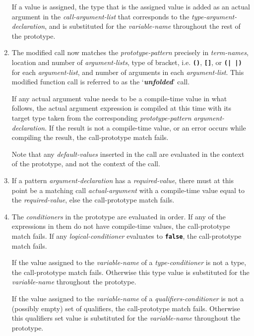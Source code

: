 \documentclass[12pt]{article}
\newcommand{\TT}[1]{{\tt \bfseries #1}}
\newcommand{\mkey}[2]{{\bf \em #1}\index{#1!#2}}
\begin{document}
\begin{enumerate}
If a value is assigned,
the type that is the assigned value is added as an actual argument
in the {\em call-argument-list} that corresponds
to the {\em type-argument-declaration}, and
is substituted for the {\em variable-name} throughout the rest of the
prototype.

\item
The modified call now matches the {\em prototype-pattern}
precisely in {\em term-names},
location and number of {\em argument-lists}, type of bracket, i.e. \TT{()},
\TT{[]}, or \TT{(|~|)} for each {\em argument-list}, and number of
arguments in each {\em argument-list}.
This modified function call is referred to as the
`\mkey{unfolded}{call}' call.

If any actual argument value needs to be a compile-time value in what
follows, the actual argument expression is compiled at this
time with its target type taken from the corresponding
{\em prototype-pattern} {\em argument-declaration}.
If the result is not a compile-time value, or an error occurs
while compiling the result, the call-prototype
match fails.

Note that any {\em default-values} inserted in the call
are evaluated in the context of the prototype, and not the
context of the call.

\item
If a pattern {\em argument-declaration} has a {\em required-value},
there must at this point be a matching call {\em actual-argument}
with a compile-time value equal to the {\em required-value},
else the call-prototype match fails.

\item
The {\em conditioners} in the prototype are evaluated
in order.  If any of the expressions in them do not have compile-time
values, the call-prototype match fails.
If any {\em logical-conditioner} evaluates
to \TT{false}, the call-prototype match fails.

If the value assigned to the {\em variable-name} of a
{\em type-conditioner} is not a type, the call-prototype match fails.
Otherwise this type value is substituted for the {\em variable-name}
throughout the prototype.

If the value assigned to the {\em variable-name} of a
{\em qualifiers-conditioner} is not a (possibly empty) set of
qualifiers, the call-prototype match fails.
Otherwise this qualifiers set value is substituted for the {\em variable-name}
throughout the prototype.


\end{enumerate}
\end{document}
